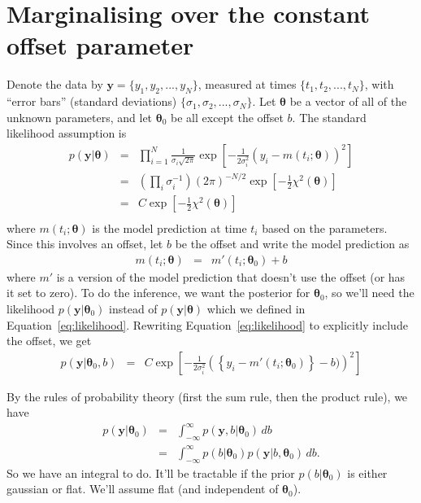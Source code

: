 \documentclass[a4paper, 11pt]{article}
\title{}
\author{}
\newcommand{\yy}{\boldsymbol{y}}	%
\newcommand{\btheta}{\boldsymbol{\theta}}  %
\begin{document}

\section{Marginalising over the constant offset parameter}
Denote the data by $\yy = \{y_1, y_2, ..., y_N\}$, measured at times
$\{t_1, t_2, ..., t_N\}$, with ``error bars'' (standard deviations)
$\{\sigma_1, \sigma_2, ..., \sigma_N\}$. Let
$\btheta$ be a vector of all of the unknown parameters,
and let $\btheta_0$ be all except the offset $b$.
The standard likelihood assumption is
\begin{eqnarray}
p(\yy | \btheta) &=& \prod_{i=1}^N \frac{1}{\sigma_i\sqrt{2\pi}}
\exp\left[
-\frac{1}{2\sigma_i^2}
\left(y_i - m(t_i ;\btheta)
\right)^2
\right]\label{eq:likelihood}\\
&=&
\left(\prod_i \sigma_i^{-1}\right)(2\pi)^{-N/2}
\exp\left[-\frac{1}{2}\chi^2(\btheta)\right]\\
&=&
C
\exp\left[-\frac{1}{2}\chi^2(\btheta)\right]\\
\end{eqnarray}
where $m(t_i; \btheta)$ is the model prediction at time $t_i$ based on the
parameters. Since this involves an offset, let $b$ be the offset and write
the model prediction as
\begin{eqnarray}
m(t_i; \btheta) &=& m'(t_i; \btheta_0) + b
\end{eqnarray}
where $m'$ is a version of the model prediction that doesn't use the offset
(or has it set to zero). To do the inference, we want the posterior for
$\btheta_0$, so we'll need the likelihood $p(\yy | \btheta_0)$ instead of
$p(\yy | \btheta)$ which we defined in Equation~\ref{eq:likelihood}.
Rewriting Equation~\ref{eq:likelihood} to explicitly include the offset, we
get
\begin{eqnarray}
p(\yy | \btheta_0, b) &=& C
\exp\left[
-\frac{1}{2\sigma_i^2}
\left(\left\{y_i - m'(t_i; \btheta_0)\right\} - b)
\right)^2
\right]
\end{eqnarray}

By the rules of probability theory (first the sum rule, then the product rule),
we have
\begin{eqnarray}
p(\yy | \btheta_0) &=& \int_{-\infty}^\infty p(\yy, b | \btheta_0) \, db\\
&=& \int_{-\infty}^\infty p(b | \btheta_0)p(\yy | b, \btheta_0) \, db.
\label{eq:integral}
\end{eqnarray}
So we have an integral to do. It'll be tractable if the prior $p(b | \btheta_0)$
is either gaussian or flat. We'll assume flat (and independent of $\btheta_0$).
\end{document}
